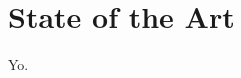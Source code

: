 \documentclass[../main/report.tex]{subfiles}
\begin{document}
\chapter{State of the Art}

Yo.
\end{document}
